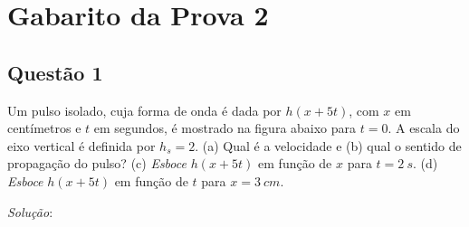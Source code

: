 \documentclass[12pt,a4paper,brazilian, fleqn]{article}
\begin{document}
\section*{\centering Gabarito da Prova 2}

\subsection*{Questão 1}

Um pulso isolado, cuja forma de onda é dada por \(h(x + 5t)\), com \(x\) em centímetros e 
\(t\) em segundos, é mostrado na figura abaixo para \(t = 0\). A escala do eixo vertical é definida 
por \(h_s = 2\). (a) Qual é a velocidade e (b) qual o sentido de propagação do pulso? 
(c) \textit{Esboce} \(h(x + 5t)\) em função de \(x\) para \(t = \SI{2}{s}\). (d) \textit{Esboce} \(h(x + 5t)\)
em função de \(t\) para \(x = \SI{3}{cm}\).

\textit{Solução}:

\begin{center}
\end{center}
\end{document}

